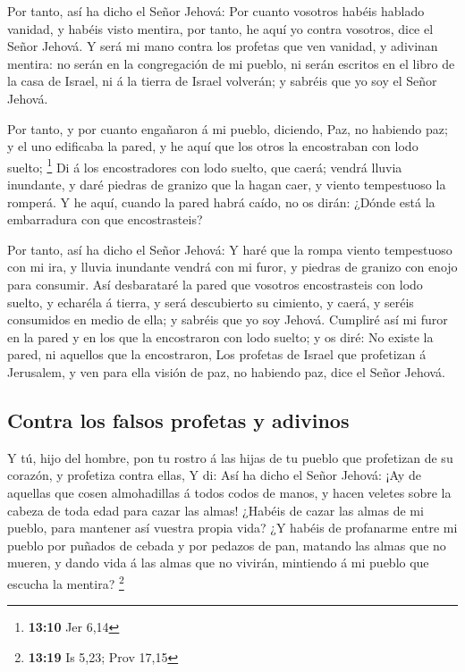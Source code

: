  Por tanto, así ha dicho el Señor Jehová: Por cuanto
vosotros habéis hablado vanidad, y habéis visto mentira, por tanto, he
aquí yo contra vosotros, dice el Señor Jehová.  Y será mi
mano contra los profetas que ven vanidad, y adivinan mentira: no serán
en la congregación de mi pueblo, ni serán escritos en el libro de la
casa de Israel, ni á la tierra de Israel volverán; y sabréis que yo soy
el Señor Jehová.

 Por tanto, y por cuanto engañaron á mi pueblo, diciendo,
Paz, no habiendo paz; y el uno edificaba la pared, y he aquí que los
otros la encostraban con lodo suelto; \footnote{\textbf{13:10} Jer 6,14}
 Di á los encostradores con lodo suelto, que caerá;
vendrá lluvia inundante, y daré piedras de granizo que la hagan caer, y
viento tempestuoso la romperá.  Y he aquí, cuando la
pared habrá caído, no os dirán: ¿Dónde está la embarradura con que
encostrasteis?

 Por tanto, así ha dicho el Señor Jehová: Y haré que la
rompa viento tempestuoso con mi ira, y lluvia inundante vendrá con mi
furor, y piedras de granizo con enojo para consumir.  Así
desbarataré la pared que vosotros encostrasteis con lodo suelto, y
echaréla á tierra, y será descubierto su cimiento, y caerá, y seréis
consumidos en medio de ella; y sabréis que yo soy Jehová.
 Cumpliré así mi furor en la pared y en los que la
encostraron con lodo suelto; y os diré: No existe la pared, ni aquellos
que la encostraron,  Los profetas de Israel que
profetizan á Jerusalem, y ven para ella visión de paz, no habiendo paz,
dice el Señor Jehová.

\hypertarget{contra-los-falsos-profetas-y-adivinos}{%
\subsection{Contra los falsos profetas y
adivinos}\label{contra-los-falsos-profetas-y-adivinos}}

 Y tú, hijo del hombre, pon tu rostro á las hijas de tu
pueblo que profetizan de su corazón, y profetiza contra ellas,
 Y di: Así ha dicho el Señor Jehová: ¡Ay de aquellas que
cosen almohadillas á todos codos de manos, y hacen veletes sobre la
cabeza de toda edad para cazar las almas! ¿Habéis de cazar las almas de
mi pueblo, para mantener así vuestra propia vida?  ¿Y
habéis de profanarme entre mi pueblo por puñados de cebada y por pedazos
de pan, matando las almas que no mueren, y dando vida á las almas que no
vivirán, mintiendo á mi pueblo que escucha la mentira? \footnote{\textbf{13:19}
  Is 5,23; Prov 17,15}

